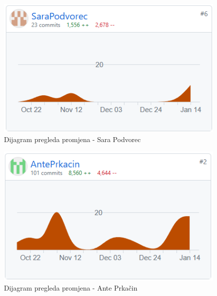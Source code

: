		\begin{figure}[H]
			\includegraphics[scale=0.80]{slike/sara.png} %
			\centering
			\caption{Dijagram pregleda promjena - Sara Podvorec}
			\label{fig:DijagramPregledaPromjena}
		\end{figure}

		\begin{figure}[H]
			\includegraphics[scale=0.80]{slike/ante.png} %
			\centering
			\caption{Dijagram pregleda promjena - Ante Prkačin}
			\label{fig:DijagramPregledaPromjena}
		\end{figure}




